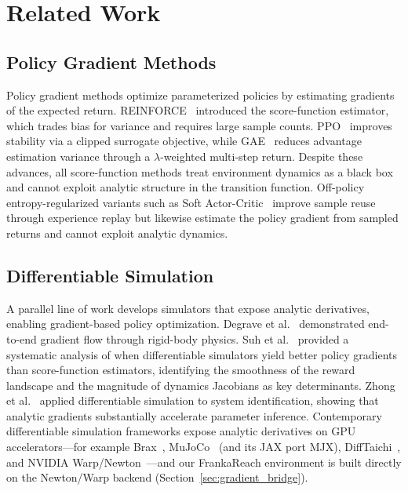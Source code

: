 \documentclass[11pt,a4paper]{article}
\begin{document}
\section{Related Work}
\label{sec:related}

\subsection{Policy Gradient Methods}
\label{sec:related_pg}

Policy gradient methods optimize parameterized policies by estimating gradients of the expected return. REINFORCE~\cite{williams1992reinforce} introduced the score-function estimator, which trades bias for variance and requires large sample counts. PPO~\cite{schulman2017ppo} improves stability via a clipped surrogate objective, while GAE~\cite{schulman2016gae} reduces advantage estimation variance through a $\lambda$-weighted multi-step return. Despite these advances, all score-function methods treat environment dynamics as a black box and cannot exploit analytic structure in the transition function. Off-policy entropy-regularized variants such as Soft Actor-Critic~\cite{haarnoja2018sac} improve sample reuse through experience replay but likewise estimate the policy gradient from sampled returns and cannot exploit analytic dynamics.

\subsection{Differentiable Simulation}
\label{sec:related_diff_sim}

A parallel line of work develops simulators that expose analytic derivatives, enabling gradient-based policy optimization. Degrave et al.~\cite{degrave2019differentiable} demonstrated end-to-end gradient flow through rigid-body physics. Suh et al.~\cite{suh2022differentiable} provided a systematic analysis of when differentiable simulators yield better policy gradients than score-function estimators, identifying the smoothness of the reward landscape and the magnitude of dynamics Jacobians as key determinants. Zhong et al.~\cite{zhong2022differentiable} applied differentiable simulation to system identification, showing that analytic gradients substantially accelerate parameter inference. Contemporary differentiable simulation frameworks expose analytic derivatives on GPU accelerators---for example Brax~\cite{freeman2021brax}, MuJoCo~\cite{todorov2012mujoco} (and its JAX port MJX), DiffTaichi~\cite{hu2020difftaichi}, and NVIDIA Warp/Newton~\cite{nvidia_warp}---and our FrankaReach environment is built directly on the Newton/Warp backend (Section~\ref{sec:gradient_bridge}).
\end{document}
